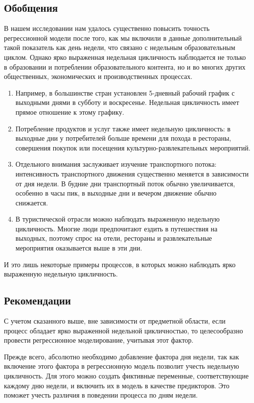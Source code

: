 \documentclass[a4paper,12pt]{article}
\begin{document}
\subsection{Обобщения}
В нашем исследовании нам удалось существенно повысить точность регрессионной модели после того, как мы включили в данные дополнительный такой показатель как день недели, что связано с недельным образовательным циклом. Однако ярко выраженная недельная цикличность наблюдается не только в образовании и потреблении образовательного контента, но и во многих других  общественных, экономических и производственных процессах. 
\medskip
\begin{enumerate}
	\item Например, в большинстве стран установлен 5-дневный рабочий график с выходными днями в субботу и воскресенье. Недельная цикличность имеет прямое отношение к этому графику.
	\item Потребление продуктов и услуг также имеет недельную цикличность: в выходные дни у потребителей больше времени для похода в рестораны, совершения покупок или посещения культурно-развлекательных мероприятий.
	\item Отдельного внимания заслуживает изучение транспортного потока: интенсивность транспортного движения существенно меняется в зависимости от дня недели. В будние дни транспортный поток обычно увеличивается, особенно в часы пик, в выходные дни и вечером движение обычно снижается.
	\item В туристической отрасли можно наблюдать выраженную недельную цикличность. Многие люди предпочитают ездить в путешествия на выходных, поэтому спрос на отели, рестораны и развлекательные мероприятия оказывается выше в эти дни.
\end{enumerate}
\medskip
И это лишь некоторые примеры процессов, в которых можно наблюдать ярко выраженную недельную цикличность.
 
\subsection{Рекомендации}

С учетом сказанного выше, вне зависимости от предметной области, если процесс обладает ярко выраженной недельной цикличностью, то целесообразно провести регрессионное моделирование, учитывая этот фактор. 

Прежде всего, абсолютно необходимо добавление фактора дня недели, так как включение этого фактора в регрессионную модель позволит учесть недельную цикличность. Для этого можно создать фиктивные переменные, соответствующие каждому дню недели, и включить их в модель в качестве предикторов. Это поможет учесть различия в поведении процесса по дням недели.
\end{document}
